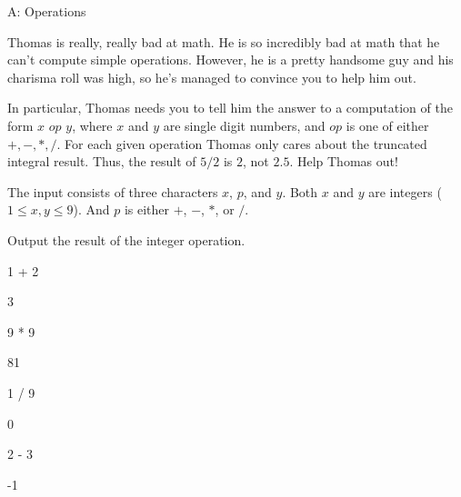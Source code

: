 \begin{problem}{A: Operations}

Thomas is really, really bad at math.
He is so incredibly bad at math that he can't compute simple operations.
However, he is a pretty handsome guy and his charisma roll was high, so he's managed to convince you to help him out.

In particular, Thomas needs you to tell him the answer to a computation of the form $x$ $op$ $y$, where $x$ and $y$ are single digit numbers, and ${op}$ is one of either $+, -, *, /$.
For each given operation Thomas only cares about the truncated integral result.
Thus, the result of $5 / 2$ is $2$, not $2.5$.
Help Thomas out!

\end{problem}

\begin{formalin}
The input consists of three characters $x$, $p$, and $y$.
Both $x$ and $y$ are integers ($1 \leq x, y \leq 9$).
And $p$ is either $+$, $-$, $*$, or $/$.
\end{formalin}

\begin{formalout}
Output the result of the integer operation.
\end{formalout}

\begin{datain}
1 + 2
\end{datain}
\begin{dataout}
3
\end{dataout}

\begin{datain}
9 * 9
\end{datain}
\begin{dataout}
81
\end{dataout}

\begin{datain}
1 / 9
\end{datain}
\begin{dataout}
0
\end{dataout}

\begin{datain}
2 - 3
\end{datain}
\begin{dataout}
-1
\end{dataout}
